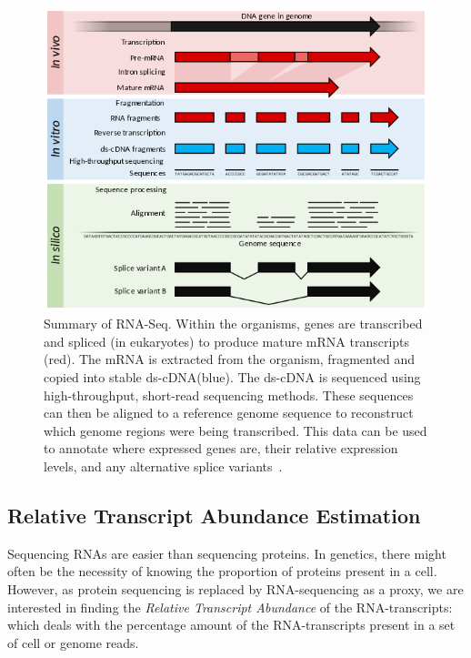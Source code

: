 \begin{figure}[htp]
\centering
\includegraphics[scale=0.70]{Summary_of_RNA-Seq.svg.png}
\caption{Summary of RNA-Seq. Within the organisms, genes are transcribed and spliced (in eukaryotes) to produce mature mRNA transcripts (red). The mRNA is extracted from the organism, fragmented and copied into stable ds-cDNA(blue). The ds-cDNA is sequenced using high-throughput, short-read sequencing methods. These sequences can then be aligned to a reference genome sequence to reconstruct which genome regions were being transcribed. This data can be used to annotate where expressed genes are, their relative expression levels, and any alternative splice variants~\cite{wiki:rnaseq}.}
\label{rnaseq}
\end{figure} 

\subsection{Relative Transcript Abundance Estimation}

Sequencing RNAs are easier than sequencing proteins. In genetics, there might often be the necessity of knowing the proportion of proteins present in a cell. However, as protein sequencing is replaced by RNA-sequencing as a proxy, we are interested in finding the \textit{Relative Transcript Abundance} of the RNA-transcripts: which deals with the percentage amount of the RNA-transcripts present in a set of cell or genome reads.\\ 

